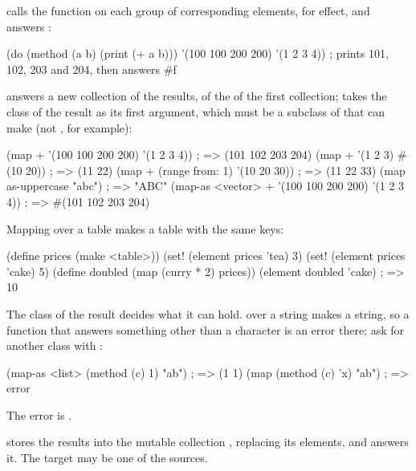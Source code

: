  calls the function on
each group of corresponding elements, for effect, and answers
:

\begin{dylan}
(do (method (a b) (print (+ a b)))
    '(100 100 200 200)
    '(1 2 3 4))
; prints 101, 102, 203 and 204, then answers #f
\end{dylan}

 answers a new collection of the results, of the
 of the first collection;  takes the
class of the result as its first argument, which must be a subclass of
 that  can make (not
, for example):

\begin{dylan}
(map + '(100 100 200 200) '(1 2 3 4))              ; => (101 102 203 204)
(map + '(1 2 3) #(10 20))                          ; => (11 22)
(map + (range from: 1) '(10 20 30))                ; => (11 22 33)
(map as-uppercase "abc")                           ; => "ABC"
(map-as <vector> + '(100 100 200 200) '(1 2 3 4))  ; => #(101 102 203 204)
\end{dylan}

\noindent Mapping over a table makes a table with the same keys:

\begin{dylan}
(define prices (make <table>))
(set! (element prices 'tea) 3)
(set! (element prices 'cake) 5)
(define doubled (map (curry * 2) prices))
(element doubled 'cake)                            ; => 10
\end{dylan}

\noindent The class of the result decides what it can hold. 
over a string makes a string, so a function that answers something other
than a character is an error there; ask for another class with
:

\begin{dylan}
(map-as <list> (method (c) 1) "ab")                ; => (1 1)
(map (method (c) 'x) "ab")                         ; => error
\end{dylan}

\noindent The error is .

stores the results into the mutable collection , replacing
its elements, and answers it. The target may be one of the sources.

